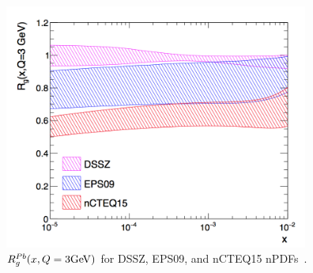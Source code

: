 \begin{figure}[!h]
  \centering
  \includegraphics[width=10cm]{chap5/figure/ModelComp/ncteq15.png}
  \caption{$R_{g}^{Pb}(x, Q=3\rm{GeV})$ for DSSZ, EPS09, and nCTEQ15 nPDFs~\cite{bib_ncteq15shadow}.}
  \label{fig_5_ncteq}
\end{figure}

